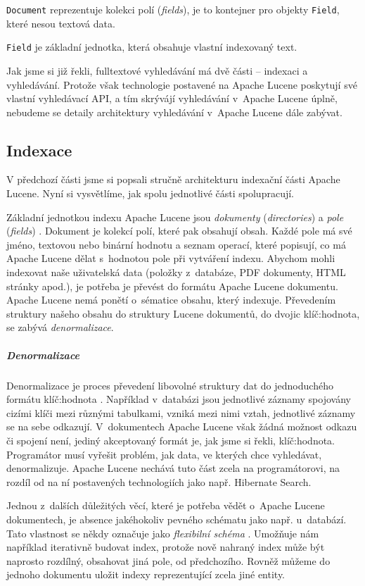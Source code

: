 \documentclass[11pt,oneside]{fithesis2}
\begin{document}
\texttt{Document} reprezentuje kolekci polí (\emph{fields}), je to kontejner pro objekty \texttt{Field}, které nesou textová data. 

\texttt{Field} je základní jednotka, která obsahuje vlastní indexovaný text.

Jak jsme si již řekli, fulltextové vyhledávání má dvě části -- indexaci a vyhledávání. Protože však technologie postavené na Apache Lucene poskytují své vlastní vyhledávací API, a tím skrývájí vyhledávání v~Apache Lucene úplně, nebudeme se detaily architektury vyhledávání v~Apache Lucene dále zabývat. 

\subsection{Indexace}
V předchozí části jsme si popsali stručně architekturu indexační části Apache Lucene. Nyní si vysvětlíme, jak spolu jednotlivé části spolupracují.

Základní jednotkou indexu Apache Lucene jsou \emph{dokumenty} (\emph{directories}) a \emph{pole} (\emph{fields}) \cite[s.~32]{LuceneAction}. Dokument je kolekcí polí, které pak obsahují  obsah. Každé pole má své jméno, textovou nebo binární hodnotu a seznam operací, které popisují, co má Apache Lucene dělat s~hodnotou pole při vytváření indexu. Abychom mohli indexovat naše uživatelská data (položky z~databáze, PDF dokumenty, HTML stránky apod.), je potřeba je převést do formátu Apache Lucene dokumentu. Apache Lucene nemá ponětí o~sématice obsahu, který indexuje. Převedením struktury našeho obsahu do struktury Lucene dokumentů, do dvojic klíč:hodnota, se zabývá \emph{denormalizace}.

\subparagraph{Denormalizace}
Denormalizace je proces převedení libovolné struktury dat do jednoduchého formátu klíč:hodnota \cite[s.~34]{LuceneAction}. Například v~databázi jsou jednotlivé záznamy spojovány cizími klíči mezi různými tabulkami, vzniká mezi nimi vztah, jednotlivé záznamy se na sebe odkazují. V~dokumentech Apache Lucene však žádná možnost odkazu či spojení není, jediný akceptovaný formát je, jak jsme si řekli, klíč:hodnota. Programátor musí vyřešit problém, jak data, ve kterých chce vyhledávat, denormalizuje. Apache Lucene nechává tuto část zcela na programátorovi, na rozdíl od na ní postavených technologiích jako např. Hibernate Search.

Jednou z~dalších důležitých věcí, které je potřeba vědět o~Apache Lucene dokumentech, je absence jakéhokoliv pevného schématu jako např. u~databází. Tato vlastnost se někdy označuje jako \emph{flexibilní schéma} \cite[s.~34]{LuceneAction}. Umožňuje nám například iterativně budovat index, protože nově nahraný index může být naprosto rozdílný, obsahovat jiná pole, od předchozího. Rovněž můžeme do jednoho dokumentu uložit indexy reprezentující zcela jiné entity.
\end{document}
